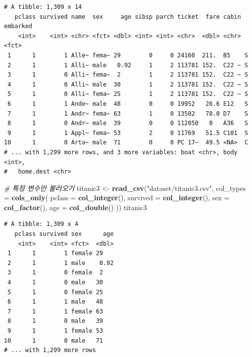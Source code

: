 \documentclass[
  11pt,
]{krantz}
\newenvironment{Shaded}{\begin{snugshade}}{\end{snugshade}}
\newcommand{\CommentTok}[1]{\textcolor[rgb]{0.37,0.37,0.37}{\textit{#1}}}
\newcommand{\DataTypeTok}[1]{\textcolor[rgb]{0.27,0.27,0.27}{#1}}
\newcommand{\KeywordTok}[1]{\textcolor[rgb]{0.27,0.27,0.27}{\textbf{#1}}}
\newcommand{\NormalTok}[1]{#1}
\newcommand{\StringTok}[1]{\textcolor[rgb]{0.5,0.5,0.5}{#1}}
\begin{document}
\begin{verbatim}
# A tibble: 1,309 x 14
   pclass survived name  sex     age sibsp parch ticket  fare cabin embarked
    <int>    <int> <chr> <fct> <dbl> <int> <int> <chr>  <dbl> <chr> <fct>   
 1      1        1 Alle~ fema~ 29        0     0 24160  211.  B5    S       
 2      1        1 Alli~ male   0.92     1     2 113781 152.  C22 ~ S       
 3      1        0 Alli~ fema~  2        1     2 113781 152.  C22 ~ S       
 4      1        0 Alli~ male  30        1     2 113781 152.  C22 ~ S       
 5      1        0 Alli~ fema~ 25        1     2 113781 152.  C22 ~ S       
 6      1        1 Ande~ male  48        0     0 19952   26.6 E12   S       
 7      1        1 Andr~ fema~ 63        1     0 13502   78.0 D7    S       
 8      1        0 Andr~ male  39        0     0 112050   0   A36   S       
 9      1        1 Appl~ fema~ 53        2     0 11769   51.5 C101  S       
10      1        0 Arta~ male  71        0     0 PC 17~  49.5 <NA>  C       
# ... with 1,299 more rows, and 3 more variables: boat <chr>, body <int>,
#   home.dest <chr>
\end{verbatim}

\begin{Shaded}
\begin{Highlighting}[]
\CommentTok{# 특정 변수만 불러오기}
\NormalTok{titanic3 <-}\StringTok{ }\KeywordTok{read_csv}\NormalTok{(}\StringTok{"dataset/titanic3.csv"}\NormalTok{, }
                     \DataTypeTok{col_types =} \KeywordTok{cols_only}\NormalTok{(}
                       \DataTypeTok{pclass =} \KeywordTok{col_integer}\NormalTok{(), }
                       \DataTypeTok{survived =} \KeywordTok{col_integer}\NormalTok{(), }
                       \DataTypeTok{sex =} \KeywordTok{col_factor}\NormalTok{(), }
                       \DataTypeTok{age =} \KeywordTok{col_double}\NormalTok{()}
\NormalTok{                     ))}
\NormalTok{titanic3}
\end{Highlighting}
\end{Shaded}

\begin{verbatim}
# A tibble: 1,309 x 4
   pclass survived sex      age
    <int>    <int> <fct>  <dbl>
 1      1        1 female 29   
 2      1        1 male    0.92
 3      1        0 female  2   
 4      1        0 male   30   
 5      1        0 female 25   
 6      1        1 male   48   
 7      1        1 female 63   
 8      1        0 male   39   
 9      1        1 female 53   
10      1        0 male   71   
# ... with 1,299 more rows
\end{verbatim}
\end{document}
